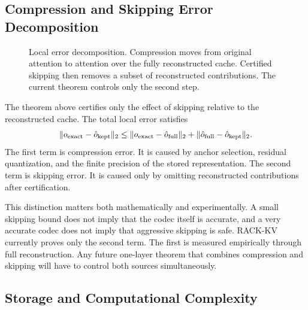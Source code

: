 \subsection{Compression and Skipping Error Decomposition}

\begin{figure}[t]
  \centering
  
  \caption{Local error decomposition. Compression moves from original attention to attention over the fully reconstructed cache. Certified skipping then removes a subset of reconstructed contributions. The current theorem controls only the second step.}
  \label{fig:decomp}
\end{figure}

The theorem above certifies only the effect of skipping relative to the reconstructed cache. The total local error satisfies
\begin{equation}
  \lVert o_{\mathrm{exact}} - \hat{o}_{\mathrm{kept}} \rVert_2
  \le
  \lVert o_{\mathrm{exact}} - \hat{o}_{\mathrm{full}} \rVert_2
  +
  \lVert \hat{o}_{\mathrm{full}} - \hat{o}_{\mathrm{kept}} \rVert_2.
\end{equation}
The first term is compression error. It is caused by anchor selection, residual quantization, and the finite precision of the stored representation. The second term is skipping error. It is caused only by omitting reconstructed contributions after certification.

This distinction matters both mathematically and experimentally. A small skipping bound does not imply that the codec itself is accurate, and a very accurate codec does not imply that aggressive skipping is safe. RACK-KV currently proves only the second term. The first is measured empirically through full reconstruction. Any future one-layer theorem that combines compression and skipping will have to control both sources simultaneously.

\subsection{Storage and Computational Complexity}

